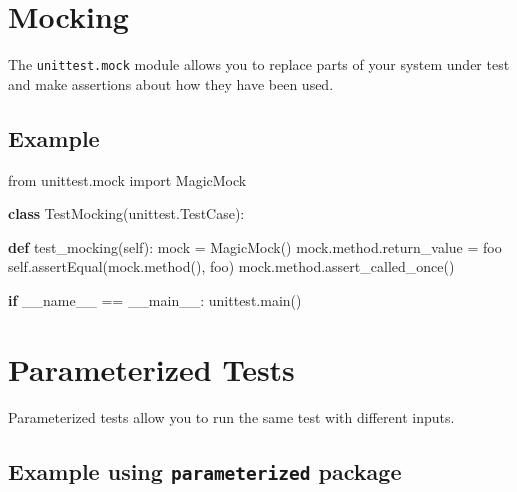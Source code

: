 \documentclass[
  letterpaper,
  DIV=11,
  numbers=noendperiod]{scrreprt}
\newenvironment{Shaded}{\begin{snugshade}}{\end{snugshade}}
\newcommand{\ControlFlowTok}[1]{\textcolor[rgb]{0.00,0.23,0.31}{\textbf{#1}}}
\newcommand{\ImportTok}[1]{\textcolor[rgb]{0.00,0.46,0.62}{#1}}
\newcommand{\KeywordTok}[1]{\textcolor[rgb]{0.00,0.23,0.31}{\textbf{#1}}}
\newcommand{\NormalTok}[1]{\textcolor[rgb]{0.00,0.23,0.31}{#1}}
\newcommand{\OperatorTok}[1]{\textcolor[rgb]{0.37,0.37,0.37}{#1}}
\newcommand{\StringTok}[1]{\textcolor[rgb]{0.13,0.47,0.30}{#1}}
\newcommand{\VariableTok}[1]{\textcolor[rgb]{0.07,0.07,0.07}{#1}}
\begin{document}
\section{Mocking}\label{mocking}

The \texttt{unittest.mock} module allows you to replace parts of your
system under test and make assertions about how they have been used.

\subsection{Example}\label{example-16}

\begin{Shaded}
\begin{Highlighting}[]
\ImportTok{from}\NormalTok{ unittest.mock }\ImportTok{import}\NormalTok{ MagicMock}

\KeywordTok{class}\NormalTok{ TestMocking(unittest.TestCase):}

    \KeywordTok{def}\NormalTok{ test\_mocking(}\VariableTok{self}\NormalTok{):}
\NormalTok{        mock }\OperatorTok{=}\NormalTok{ MagicMock()}
\NormalTok{        mock.method.return\_value }\OperatorTok{=} \StringTok{\textquotesingle{}foo\textquotesingle{}}
        \VariableTok{self}\NormalTok{.assertEqual(mock.method(), }\StringTok{\textquotesingle{}foo\textquotesingle{}}\NormalTok{)}
\NormalTok{        mock.method.assert\_called\_once()}

\ControlFlowTok{if} \VariableTok{\_\_name\_\_} \OperatorTok{==} \StringTok{\textquotesingle{}\_\_main\_\_\textquotesingle{}}\NormalTok{:}
\NormalTok{    unittest.main()}
\end{Highlighting}
\end{Shaded}

\section{Parameterized Tests}\label{parameterized-tests}

Parameterized tests allow you to run the same test with different
inputs.

\subsection{\texorpdfstring{Example using \texttt{parameterized}
package}{Example using parameterized package}}\label{example-using-parameterized-package}
\end{document}
